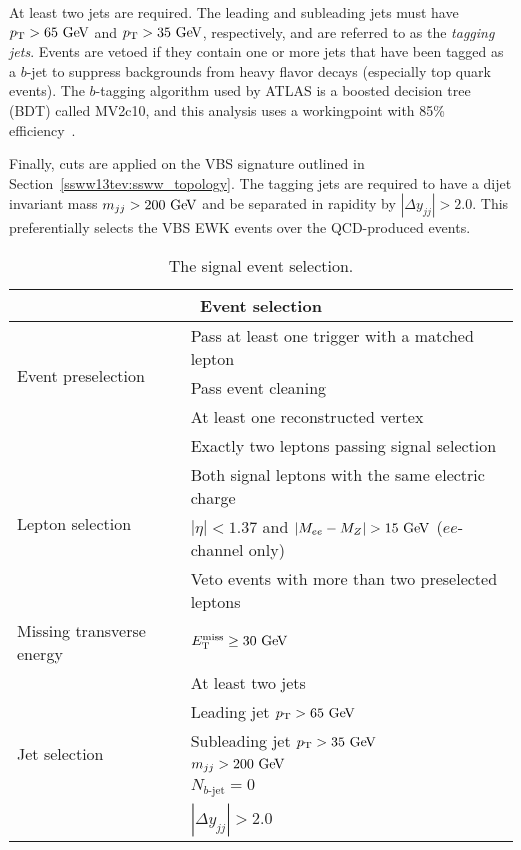 At least two jets are required.
The leading and subleading jets must have $\pt > 65\gev$ and $\pt > 35\gev$, respectively, and are referred to as the \emph{tagging jets}.
Events are vetoed if they contain one or more jets that have been tagged as a $b$-jet to suppress backgrounds from heavy flavor decays (especially top quark events).
The $b$-tagging algorithm used by ATLAS is a boosted decision tree (BDT) called MV2c10, and this analysis uses a workingpoint with 85\% efficiency~\cite{2018.btag-efficiency-13tev}.

Finally, cuts are applied on the VBS signature outlined in Section~\ref{ssww13tev:ssww_topology}.
The tagging jets are required to have a dijet invariant mass $m_{jj} > 200\gev$ and be separated in rapidity by $|\Delta y_{jj}| > 2.0$.
This preferentially selects the VBS EWK events over the QCD-produced \ssww events.

\begin{table}[htbp]
  \centering
  \begin{tabular}{l | l}
    \multicolumn{2}{c}{Event selection} \\
    \hline\hline
    \multirow{3}{*}{Event preselection} & Pass at least one trigger with a matched lepton \\
                                        & Pass event cleaning \\
                                        & At least one reconstructed vertex\\
    \hline
    \multirow{4}{*}{Lepton selection}   & Exactly two leptons passing signal selection \\
                                        & Both signal leptons with the same electric charge \\
                                        & $|\eta| < 1.37$ and $|M_{ee} - M_Z| > 15\gev$ ($ee$-channel only) \\
                                        & Veto events with more than two preselected leptons \\
    \hline
    Missing transverse energy           & $\met \ge 30\gev$\\
    \hline
    \multirow{6}{*}{Jet selection}      & At least two jets \\
                                        & Leading jet $\pt > 65\gev$ \\
                                        & Subleading jet $\pt > 35\gev$\\
                                        & $m_{jj} > 200\gev$ \\
                                        & $N_{b\textrm{-jet}} = 0$ \\ %
                                        & $|\Delta y_{jj}| > 2.0$ \\
    \hline
  \end{tabular}
  \caption{The signal event selection.}
  \label{tab:ssww13tev_event_selection}
\end{table}
